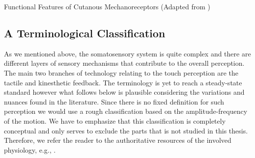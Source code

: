 %
\begin{table}%
\centering
\caption[Functional Features of Cutanous Mechanoreceptors]{Functional Features of Cutanous Mechanoreceptors (Adapted from \cite{idareview})}
{\tiny
{}
}%
\label{tab:mechano}
\end{table}
\subsection{A Terminological Classification}

As we mentioned above, the somatosensory system is quite complex and there are different layers of sensory mechanisms that contribute to the overall perception. The main two branches of technology relating to the touch perception are the tactile and kinesthetic  feedback. The terminology is yet to reach a steady-state standard however what follows below is plausible considering the variations and nuances found in the literature. Since there is no fixed definition for such perception we would use a rough  classification based on the amplitude-frequency of the motion. We have to emphasize that this classification is completely conceptual and only serves to exclude the parts that is not studied in this thesis. Therefore, we refer the reader to the authoritative resources of the involved physiology, e.g., \cite{kandel}. 

